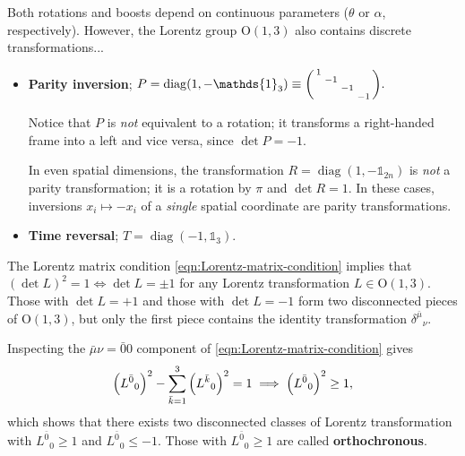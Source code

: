 Both rotations and boosts depend on continuous parameters ($\theta$ or $\alpha$, respectively).
However, the Lorentz group $\mathrm{O}(1,3)$ also contains discrete transformations...
\begin{itemize}

    \item \textbf{Parity inversion};
    \begin{math}
        P = \operatorname{diag}(1, -\mathds{1}_3) \equiv
        \smqty(1 & & & \\ & -1 & & \\ & & -1 & \\ & & & -1)
    .\end{math}
    \begin{center}
            
    \end{center}
    Notice that $P$ is \textit{not} equivalent to a rotation; it transforms a right-handed frame into a left and vice versa, since $\det P = -1$.
    \begin{note}
    In even spatial dimensions, the transformation $R = \operatorname{diag}(1, -\mathds{1}_{2n})$ is \textit{not} a parity transformation; it is a rotation by $\pi$ and $\det R = 1$.
    In these cases, inversions $x_i \mapsto -x_i$ of a \textit{single} spatial coordinate are parity transformations.
    \end{note}

    \item \textbf{Time reversal};
    \begin{math}
        T = \operatorname{diag}(-1, \mathds{1}_3)
    .\end{math}
\end{itemize}

The Lorentz matrix condition \eqref{eqn:Lorentz-matrix-condition} implies that $(\det L)^2 = 1 \iff \det L = \pm 1$ for any Lorentz transformation $L \in \mathrm{O}(1,3)$.
Those with $\det L = +1$ and those with $\det L = -1$ form two disconnected pieces of $\mathrm{O}(1,3)$, but only the first piece contains the identity transformation $\delta^{\bar\mu}{}_\nu$.

Inspecting the $\bar\mu\nu = \bar00$ component of \eqref{eqn:Lorentz-matrix-condition} gives
\begin{align}
    \qty(L^{\bar0}{}_0)^2 - \sum_{\bar k = 1}^3\qty(L^{\bar k}{}_0)^2 = 1
    \implies
    \qty(L^{\bar0}{}_0)^2 \ge 1
,\end{align}
which shows that there exists two disconnected classes of Lorentz transformation with $L^{\bar0}{}_0 \ge 1$ and $L^{\bar0}{}_0 \le -1$.
Those with $L^{\bar0}{}_0 \ge 1$ are called \textbf{orthochronous}.

